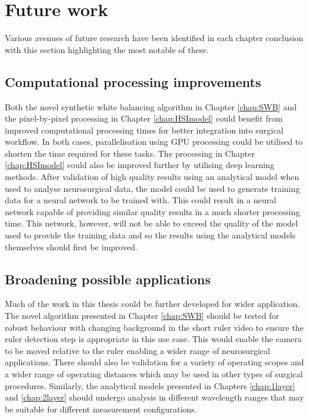 \section{Future work}
Various avenues of future research have been identified in each chapter conclusion with this section highlighting the most notable of these. 

\subsection{Computational processing improvements}
Both the novel synthetic white balancing algorithm in Chapter \ref{chap:SWB} and the pixel-by-pixel processing in Chapter \ref{chap:HSImodel} could benefit from improved computational processing times for better integration into surgical workflow. In both cases, parallelisation using GPU processing could be utilised to shorten the time required for these tasks. The processing in Chapter \ref{chap:HSImodel} could also be improved further by utilising deep learning methods. After validation of high quality results using an analytical model when used to analyse neurosurgical data, the model could be used to generate training data for a neural network to be trained with. This could result in a neural network capable of providing similar quality results in a much shorter processing time. This network, however, will not be able to exceed the quality of the model used to provide the training data and so the results using the analytical models themselves should first be improved. 

\subsection{Broadening possible applications}
Much of the work in this thesis could be further developed for wider application. The novel algorithm presented in Chapter \ref{chap:SWB} should be tested for robust behaviour with changing background in the short ruler video to ensure the ruler detection step is appropriate in this use case. This would enable the camera to be moved relative to the ruler enabling a wider range of neurosurgical applications. There should also be validation for a variety of operating scopes and a wider range of operating distances which may be used in other types of surgical procedures. Similarly, the analytical models presented in Chapters \ref{chap:1layer} and \ref{chap:2layer} should undergo analysis in different wavelength ranges that may be suitable for different measurement configurations. 

